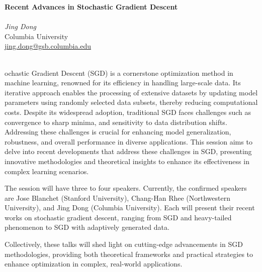 \documentclass[12pt,a4paper,figuresright]{book}
\newcommand{\organizer}[3]{%
	{\textit{#1}}\\\nopagebreak%
	#2\\\nopagebreak%
	\url{#3}\vspace{3mm}\\\nopagebreak%
	}
\newenvironment{session}[5] %
 {%
  \vskip 0pt\nopagebreak%
  \textbf{#1}\vspace{3mm}\\\nopagebreak%
  \ifthenelse{\equal{#2}{1}}{Organizer:}{Organizers:}%
  \vspace{2mm}\\\nopagebreak%
  #3
  \ifthenelse{\equal{#2}{2}}{#4}{}%
  \ifthenelse{\equal{#2}{3}}{#4#5}{}%
  \quad\\\nopagebreak%
 }
 {\nopagebreak}%
\begin{document}
\begin{session}
  {Recent Advances in Stochastic Gradient Descent}%
  {1} %
  {\organizer{Jing Dong}%
    {Columbia University}%
    {jing.dong@gsb.columbia.edu}}%

Stochastic Gradient Descent (SGD) is a cornerstone optimization method in machine learning,
renowned for its efficiency in handling large-scale data. Its iterative approach enables
the processing of extensive datasets by updating model parameters using randomly selected
data subsets, thereby reducing computational costs. Despite its widespread adoption, traditional
SGD faces challenges such as convergence to sharp minima, and sensitivity to data
distribution shifts. Addressing these challenges is crucial for enhancing model generalization,
robustness, and overall performance in diverse applications. This session aims to delve into
recent developments that address these challenges in SGD, presenting innovative methodologies
and theoretical insights to enhance its effectiveness in complex learning scenarios.

The session will have three to four speakers. Currently, the confirmed speakers are Jose
Blanchet (Stanford University), Chang-Han Rhee (Northwestern University), and Jing Dong
(Columbia University). Each will present their recent works on stochastic gradient descent,
ranging from SGD and heavy-tailed phenomenon to SGD with adaptively generated data.

Collectively, these talks will shed light on cutting-edge advancements in SGD methodologies,
providing both theoretical frameworks and practical strategies to enhance optimization in
complex, real-world applications.

\end{session}
\end{document}
